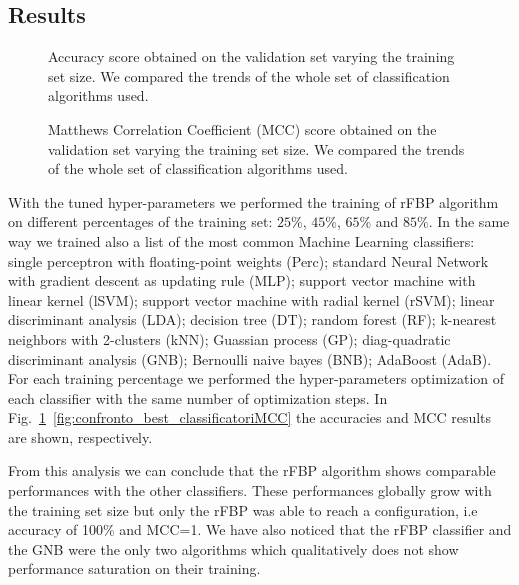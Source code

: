 \documentclass{standalone}
\begin{document}
\subsection[Results]{Results}\label{rfbp:snp_result}

\begin{figure}[htbp]
\centering
\def\svgwidth{\textwidth}

\caption{Accuracy score obtained on the validation set varying the training set size.
We compared the trends of the whole set of classification algorithms used.
}
\label{fig:confronto_bestclassificatoriACC}
\end{figure}


\begin{figure}[htbp]
\centering
\def\svgwidth{\textwidth}

\caption{Matthews Correlation Coefficient (MCC) score obtained on the validation set varying the training set size.
We compared the trends of the whole set of classification algorithms used.
}
\label{fig:confronto_bestclassificatoriMCC}
\end{figure}

With the tuned hyper-parameters we performed the training of rFBP algorithm on different percentages of the training set: $25\%$, $45\%$, $65\%$ and $85\%$.
In the same way we trained also a list of the most common Machine Learning classifiers: single perceptron with floating-point weights (Perc); standard Neural Network with gradient descent as updating rule (MLP); support vector machine with linear kernel (lSVM); support vector machine with radial kernel (rSVM); linear discriminant analysis (LDA); decision tree (DT); random forest (RF); k-nearest neighbors with 2-clusters (kNN); Guassian process (GP); diag-quadratic discriminant analysis (GNB); Bernoulli naive bayes (BNB); AdaBoost (AdaB).
For each training percentage we performed the hyper-parameters optimization of each classifier with the same number of optimization steps.
In Fig.~\ref{fig:confronto_bestclassificatoriACC}~\ref{fig:confronto_best_classificatoriMCC} the accuracies and MCC results are shown, respectively.

From this analysis we can conclude that the rFBP algorithm shows comparable performances with the other classifiers.
These performances globally grow with the training set size but only the rFBP was able to reach a  configuration, i.e accuracy of 100\% and MCC=1.
We have also noticed that the rFBP classifier and the GNB were the only two algorithms which qualitatively does not show performance saturation on their training.
\end{document}
